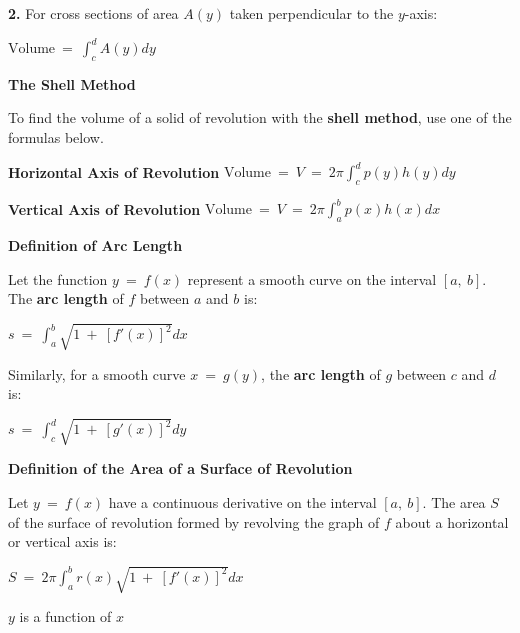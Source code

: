 \documentclass{article}
\begin{document}
\begin{large}
\hspace{0.1in} \textbf{2.} For cross sections of area $A(y)$ taken perpendicular to the $y$-axis:

\hspace{2.0in} $\text{Volume}\ =\ \displaystyle\int^{d}_{c}A(y)dy$

\textbf{The Shell Method}
\vspace{-0.1in}

\hspace{0.1in} To find the volume of a solid of revolution with the \textbf{shell method}, use one of the formulas below.

\hspace{0.2in} \textbf{Horizontal Axis of Revolution} \hspace{0.5in} $\text{Volume}\ =\ V\ =\ 2\pi\displaystyle\int^{d}_{c}p(y)h(y)dy$

\hspace{0.2in} \textbf{Vertical Axis of Revolution} \hspace{0.5in} $\text{Volume}\ =\ V\ =\ 2\pi\displaystyle\int^{b}_{a}p(x)h(x)dx$

\textbf{Definition of Arc Length}

\hspace{0.1in} Let the function $y\ =\ f(x)$ represent a smooth curve on the interval $[a,\ b]$.  The \textbf{arc length} of $f$ between $a$ and $b$ is:

\hspace{2.5in} $s\ =\ \displaystyle\int^{b}_{a}\sqrt{1\ +\ [f'(x)]^{2}}dx$

\hspace{0.1in} Similarly, for a smooth curve $x\ =\ g(y)$, the \textbf{arc length} of $g$ between $c$ and $d$ is:

\hspace{2.5in} $s\ =\ \displaystyle\int^{d}_{c}\sqrt{1\ +\ [g'(x)]^{2}}dy$

\vspace{0.25in}

\textbf{Definition of the Area of a Surface of Revolution}

\hspace{0.1in} Let $y\ =\ f(x)$ have a continuous derivative on the interval $[a,\ b]$.  The area $S$ of the surface of revolution formed by revolving the graph of $f$ about a horizontal or vertical axis is:

\hspace{1.5in} $S\ =\ 2\pi\displaystyle\int^{b}_{a}r(x)\sqrt{1\ +\ [f'(x)]^{2}}dx$ \begin{Large} $y$ is a function of $x$\end{Large}


\end{large}
\end{document}
